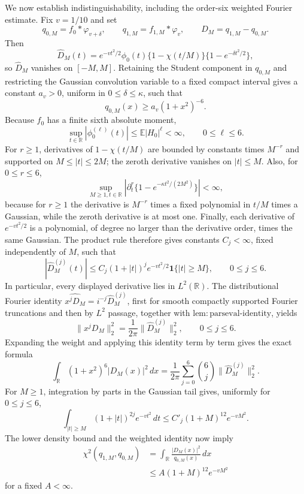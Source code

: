 We now establish indistinguishability, including the order-six weighted Fourier estimate.  Fix \(v=1/10\) and set
\[
 q_{0,M}=f_0*\varphi_{v+\delta},\qquad
 q_{1,M}=f_{1,M}*\varphi_v,
 \qquad D_M=q_{1,M}-q_{0,M}.
\]
Then
\[
 \widehat D_M(t)=e^{-vt^2/2}\phi_0(t)
 \{1-\chi(t/M)\}\{1-e^{-\delta t^2/2}\},
\]
so \(\widehat D_M\) vanishes on \([-M,M]\).  Retaining the Student component in \(q_{0,M}\) and restricting the Gaussian convolution variable to a fixed compact interval gives a constant \(a_v>0\), uniform in \(0\le\delta\le\kappa\), such that
\[
 q_{0,M}(x)\ge a_v(1+x^2)^{-6}.
\]
Because \(f_0\) has a finite sixth absolute moment,
\[
 \sup_{t\in\mathbb R}|\phi_0^{(\ell)}(t)|
 \le\mathbb E|H_0|^\ell<\infty,
 \qquad 0\le\ell\le6.
\]
For \(r\ge1\), derivatives of \(1-\chi(t/M)\) are bounded by constants times \(M^{-r}\) and supported on \(M\le|t|\le2M\); the zeroth derivative vanishes on \(|t|\le M\).  Also, for \(0\le r\le6\),
\[
 \sup_{M\ge1,t\in\mathbb R}
 \left|\partial_t^r\{1-e^{-\kappa t^2/(2M^2)}\}\right|<\infty,
\]
because for \(r\ge1\) the derivative is \(M^{-r}\) times a fixed polynomial in \(t/M\) times a Gaussian, while the zeroth derivative is at most one.  Finally, each derivative of \(e^{-vt^2/2}\) is a polynomial, of degree no larger than the derivative order, times the same Gaussian.  The product rule therefore gives constants \(C_j<\infty\), fixed independently of \(M\), such that
\[
 |\widehat D_M^{(j)}(t)|
 \le C_j(1+|t|)^j e^{-vt^2/2}
       \mathbf 1\{|t|\ge M\},
 \qquad 0\le j\le6.
\]
In particular, every displayed derivative lies in \(L^2(\mathbb R)\).  The distributional Fourier identity
\(\widehat{x^jD_M}=i^{-j}\widehat D_M^{(j)}\), first for smooth compactly supported Fourier truncations and then by \(L^2\) passage, together with \(\mathrm{lem:parseval\text{-}identity}\), yields
\[
 \|x^jD_M\|_2^2
 =\frac1{2\pi}\|\widehat D_M^{(j)}\|_2^2,
 \qquad 0\le j\le6.
\]
Expanding the weight and applying this identity term by term gives the exact formula
\[
 \int_{\mathbb R}(1+x^2)^6|D_M(x)|^2\,dx
 =\frac1{2\pi}\sum_{j=0}^{6}\binom6j
   \|\widehat D_M^{(j)}\|_2^2.
\]
For \(M\ge1\), integration by parts in the Gaussian tail gives, uniformly for \(0\le j\le6\),
\[
 \int_{|t|\ge M}(1+|t|)^{2j}e^{-vt^2}\,dt
 \le C'_j(1+M)^{12}e^{-vM^2}.
\]
The lower density bound and the weighted identity now imply
\[
 \begin{aligned}
 \chi^2(q_{1,M},q_{0,M})
 &=\int_{\mathbb R}\frac{|D_M(x)|^2}{q_{0,M}(x)}\,dx\\
 &\le A(1+M)^{12}e^{-vM^2}
 \end{aligned}
\]
for a fixed \(A<\infty\).

